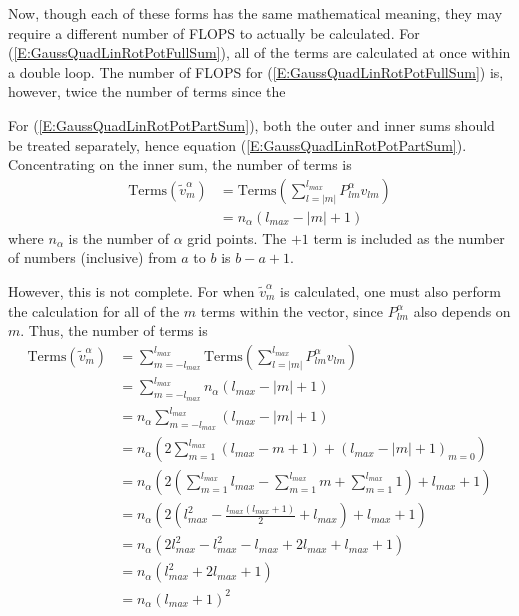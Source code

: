 \documentclass{revtex4-1}
\begin{document}
Now, though each of these forms has the same mathematical meaning, they may require a different number of FLOPS to actually be calculated. For (\ref{E:GaussQuadLinRotPotFullSum}), all of the terms are calculated at once within a double loop. The number of FLOPS for (\ref{E:GaussQuadLinRotPotFullSum}) is, however, twice the number of terms since the 


For (\ref{E:GaussQuadLinRotPotPartSum}), both the outer and inner sums should be treated separately, hence equation (\ref{E:GaussQuadLinRotPotPartSum}). Concentrating on the inner sum, the number of terms is
\begin{align}
\mbox{Terms}\!\left(\tilde{v}_{m}^{\alpha}\right) 	&= \mbox{Terms}\!\left(\sum_{l=|m|}^{l_{max}}P_{lm}^{\alpha}v_{lm}\right) \\
													&= n_{\alpha}\left(l_{max}-|m|+1\right)
\end{align}
where $n_{\alpha}$ is the number of $\alpha$ grid points. The $+1$ term is included as the number of numbers (inclusive) from $a$ to $b$ is $b-a+1$.

However, this is not complete. For when $\tilde{v}_{m}^{\alpha}$ is calculated, one must also perform the calculation for all of the $m$ terms within the vector, since $P_{lm}^{\alpha}$ also depends on $m$. Thus, the number of terms is 
\begin{align}
\mbox{Terms}\!\left(\tilde{v}_{m}^{\alpha}\right) 	&= \sum_{m=-l_{max}}^{l_{max}}\mbox{Terms}\!\left(\sum_{l=|m|}^{l_{max}}P_{lm}^{\alpha}v_{lm}\right) \\
													&= \sum_{m=-l_{max}}^{l_{max}}n_{\alpha}\left(l_{max}-|m|+1\right)\\
													&= n_{\alpha}\sum_{m=-l_{max}}^{l_{max}}\left(l_{max}-|m|+1\right)\\
													&= n_{\alpha}\left(2\sum_{m=1}^{l_{max}}\left(l_{max}-m+1\right) + \left(l_{max}-|m|+1\right)_{m=0}\right) \\
													&= n_{\alpha}\left(2\left(\sum_{m=1}^{l_{max}}l_{max}-\sum_{m=1}^{l_{max}}m+\sum_{m=1}^{l_{max}}1\right) + l_{max}+1\right) \\
													&= n_{\alpha}\left(2\left(l_{max}^{2}-\frac{l_{max}\left(l_{max}+1\right)}{2}+l_{max}\right) + l_{max}+1\right) \\
													&= n_{\alpha}\left(2l_{max}^{2}-l_{max}^{2}-l_{max}+2l_{max}+l_{max}+1\right)\\
													&= n_{\alpha}\left(l_{max}^{2}+2l_{max}+1\right) \\
													&= n_{\alpha}\left(l_{max}+1\right)^{2}
\end{align}
\end{document}
